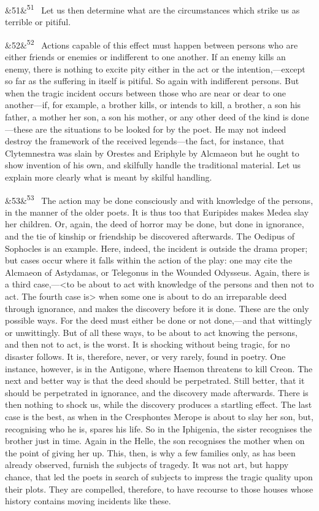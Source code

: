 \documentclass[12pt]{article}
\newcommand{\para}[1][]{\par\noindent\ifx&#1&\else\textsuperscript{\footnotesize #1}~\fi}
\begin{document}
\para[51] Let us then determine what are the circumstances which strike us as terrible or pitiful.

\para[52] Actions capable of this effect must happen between persons who are either friends or enemies or indifferent to one another. If an enemy kills an enemy, there is nothing to excite pity either in the act or the intention,---except so far as the suffering in itself is pitiful. So again with indifferent persons. But when the tragic incident occurs between those who are near or dear to one another---if, for example, a brother kills, or intends to kill, a brother, a son his father, a mother her son, a son his mother, or any other deed of the kind is done---these are the situations to be looked for by the poet. He may not indeed destroy the framework of the received legends---the fact, for instance, that Clytemnestra was slain by Orestes and Eriphyle by Alcmaeon but he ought to show invention of his own, and skilfully handle the traditional material. Let us explain more clearly what is meant by skilful handling.

\para[53] The action may be done consciously and with knowledge of the persons, in the manner of the older poets. It is thus too that Euripides makes Medea slay her children. Or, again, the deed of horror may be done, but done in ignorance, and the tie of kinship or friendship be discovered afterwards. The Oedipus of Sophocles is an example. Here, indeed, the incident is outside the drama proper; but cases occur where it falls within the action of the play: one may cite the Alcmaeon of Astydamas, or Telegonus in the Wounded Odysseus. Again, there is a third case,---<to be about to act with knowledge of the persons and then not to act. The fourth case is> when some one is about to do an irreparable deed through ignorance, and makes the discovery before it is done. These are the only possible ways. For the deed must either be done or not done,---and that wittingly or unwittingly. But of all these ways, to be about to act knowing the persons, and then not to act, is the worst. It is shocking without being tragic, for no disaster follows. It is, therefore, never, or very rarely, found in poetry. One instance, however, is in the Antigone, where Haemon threatens to kill Creon. The next and better way is that the deed should be perpetrated. Still better, that it should be perpetrated in ignorance, and the discovery made afterwards. There is then nothing to shock us, while the discovery produces a startling effect. The last case is the best, as when in the Cresphontes Merope is about to slay her son, but, recognising who he is, spares his life. So in the Iphigenia, the sister recognises the brother just in time. Again in the Helle, the son recognises the mother when on the point of giving her up. This, then, is why a few families only, as has been already observed, furnish the subjects of tragedy. It was not art, but happy chance, that led the poets in search of subjects to impress the tragic quality upon their plots. They are compelled, therefore, to have recourse to those houses whose history contains moving incidents like these.
\end{document}

